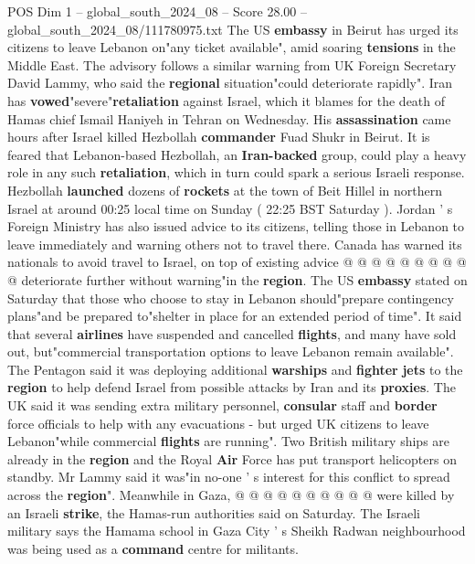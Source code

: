 \begin{textsample}{POS Dim 1 – global\_south\_2024\_08 – Score 28.00 – global\_south\_2024\_08/111780975.txt}  \label{ex:f1_pos_018}
The US \textbf{embassy} in Beirut has urged its citizens to leave Lebanon on"any ticket available", amid soaring \textbf{tensions} in the Middle East.
The advisory follows a similar warning from UK Foreign Secretary David Lammy, who said the \textbf{regional} situation"could deteriorate rapidly".
Iran has \textbf{vowed}"severe"\textbf{retaliation} against Israel, which it blames for the death of Hamas chief Ismail Haniyeh in Tehran on Wednesday.
His \textbf{assassination} came hours after Israel killed Hezbollah \textbf{commander} Fuad Shukr in Beirut.
It is feared that Lebanon-based Hezbollah, an \textbf{Iran-backed} group, could play a heavy role in any such \textbf{retaliation}, which in turn could spark a serious Israeli response.
Hezbollah \textbf{launched} dozens of \textbf{rockets} at the town of Beit Hillel in northern Israel at around 00:25 local time on Sunday ( 22:25 BST Saturday ).
Jordan ' s Foreign Ministry has also issued advice to its citizens, telling those in Lebanon to leave immediately and warning others not to travel there.
Canada has warned its nationals to avoid travel to Israel, on top of existing advice @ @ @ @ @ @ @ @ @ @ deteriorate further without warning"in the \textbf{region}.
The US \textbf{embassy} stated on Saturday that those who choose to stay in Lebanon should"prepare contingency plans"and be prepared to"shelter in place for an extended period of time".
It said that several \textbf{airlines} have suspended and cancelled \textbf{flights}, and many have sold out, but"commercial transportation options to leave Lebanon remain available".
The Pentagon said it was deploying additional \textbf{warships} and \textbf{fighter} \textbf{jets} to the \textbf{region} to help defend Israel from possible attacks by Iran and its \textbf{proxies}.
The UK said it was sending extra military personnel, \textbf{consular} staff and \textbf{border} force officials to help with any evacuations - but urged UK citizens to leave Lebanon"while commercial \textbf{flights} are running".
Two British military ships are already in the \textbf{region} and the Royal \textbf{Air} Force has put transport helicopters on standby.
Mr Lammy said it was"in no-one ' s interest for this conflict to spread across the \textbf{region}".
Meanwhile in Gaza, @ @ @ @ @ @ @ @ @ @ were killed by an Israeli \textbf{strike}, the Hamas-run authorities said on Saturday.
The Israeli military says the Hamama school in Gaza City ' s Sheikh Radwan neighbourhood was being used as a \textbf{command} centre for militants.

\end{textsample}
